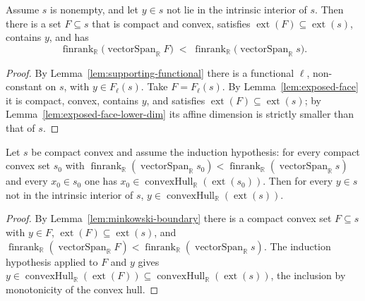\begin{lemma}
    \label{lem:minkowski-boundary}
    \leanok
    Assume $s$ is nonempty, and let $y \in s$ not lie in the intrinsic interior of
    $s$. Then there is a set $F \subseteq s$ that is compact and convex, satisfies
    $\operatorname{ext}(F) \subseteq \operatorname{ext}(s)$, contains $y$, and has
    \[
        \operatorname{finrank}_{\mathbb R}\big(\operatorname{vectorSpan}_{\mathbb R} F\big)
        \;<\;
        \operatorname{finrank}_{\mathbb R}\big(\operatorname{vectorSpan}_{\mathbb R} s\big).
    \]
\end{lemma}
\begin{proof}
    By Lemma~\ref{lem:supporting-functional} there is a functional $\ell$,
    non-constant on $s$, with $y \in F_\ell(s)$. Take $F = F_\ell(s)$. By
    Lemma~\ref{lem:exposed-face} it is compact, convex, contains $y$, and satisfies
    $\operatorname{ext}(F) \subseteq \operatorname{ext}(s)$; by
    Lemma~\ref{lem:exposed-face-lower-dim} its affine dimension is strictly smaller
    than that of $s$.
\end{proof}

\begin{lemma}
    \label{lem:minkowski-boundary-mem}
    \leanok
    Let $s$ be compact convex and assume the induction hypothesis: for every
    compact convex set $s_0$ with
    $\operatorname{finrank}_{\mathbb R}(\operatorname{vectorSpan}_{\mathbb R} s_0)
      < \operatorname{finrank}_{\mathbb R}(\operatorname{vectorSpan}_{\mathbb R} s)$
    and every $x_0 \in s_0$ one has
    $x_0 \in \operatorname{convexHull}_{\mathbb R}(\operatorname{ext}(s_0))$. Then
    for every $y \in s$ not in the intrinsic interior of $s$,
    $y \in \operatorname{convexHull}_{\mathbb R}(\operatorname{ext}(s))$.
\end{lemma}
\begin{proof}
    By Lemma~\ref{lem:minkowski-boundary} there is a compact convex set
    $F \subseteq s$ with $y \in F$,
    $\operatorname{ext}(F) \subseteq \operatorname{ext}(s)$, and
    $\operatorname{finrank}_{\mathbb R}(\operatorname{vectorSpan}_{\mathbb R} F)
      < \operatorname{finrank}_{\mathbb R}(\operatorname{vectorSpan}_{\mathbb R} s)$.
    The induction hypothesis applied to $F$ and $y$ gives
    $y \in \operatorname{convexHull}_{\mathbb R}(\operatorname{ext}(F))
      \subseteq \operatorname{convexHull}_{\mathbb R}(\operatorname{ext}(s))$, the
    inclusion by monotonicity of the convex hull.
\end{proof}


